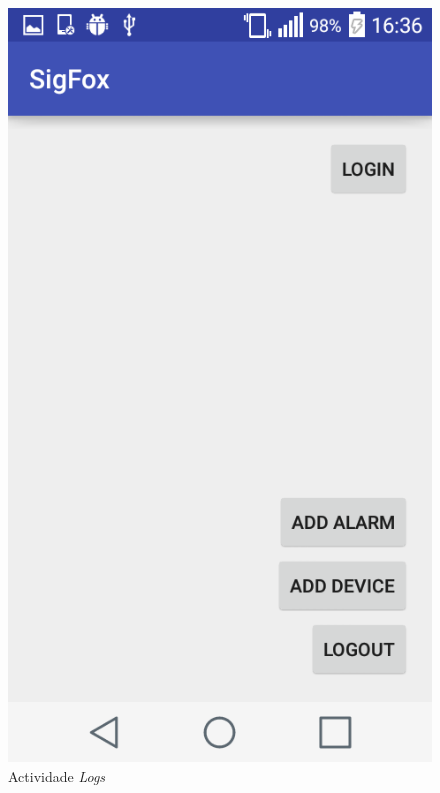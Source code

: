 \documentclass[a4paper]{article}
\begin{document}
\begin{figure}[H]
  \includegraphics[width=\linewidth]{logs.png}
  \caption{Actividade \textit{Logs}}\label{fig:logs}
\endminipage\hfill
{}%

\end{figure}
\end{document}
